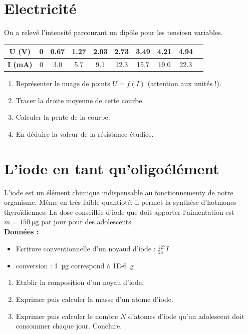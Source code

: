 \documentclass[a4paper,11pt,fleqn]{article}%
\begin{document}
\section{Electricité}
    On a relevé l'intensité parcourant un dipôle pour les tensiosn variables.\\

\begin{tabular}{|c|c|c|c|c|c|c|c|c|c|}
    \hline
    \textbf{U (V)} & \num{0} & \num{0.67} & \num{1.27} &\num{2.03} &\num{2.73} &\num{3.49} &\num{4.21} &\num{4.94}\\ 
    \hline
    \textbf{I (mA)} & \num{0} & \num{3.0} & \num{5.7} &\num{9.1} &\num{12.3} &\num{15.7} &\num{19.0} &\num{22.3} \\
    \hline
\end{tabular}
\begin{enumerate}[resume]
    \item Représenter le nuage de points $U = f(I)$ (attention aux unités !).
    \item Tracer la droite moyenne de cette courbe.
    \item Calculer la pente de la courbe.
    \item En déduire la valeur de la résistance étudiée.
\end{enumerate}

\section{L'iode en tant qu'oligoélément}
L'iode est un élément chimique indispensable au fonctionnementy de notre organisme. Même en très faible quantioté, il permet la synthèse d'hotmones thyroïdiennes. La dose conseillée d'iode que doit apporter l'aimentation est $m = \SI{150}{\micro\gram}$ par jour pour des adolescents.\\
\textbf{Données :}
\begin{itemize}
    \item Ecriture conventionnelle d'un noyaud d'iode : $^{127}_{53}I$
    \item conversion : \SI{1}{\micro\gram} correspond à \SI{1E-6}{\gram}
\end{itemize}
\begin{enumerate}
    \item Etablir la composition d'un noyau d'iode.
    \item Exprimer puis calculer la masse d'un atome d'iode.
    \item Exprimer puis calculer le nombre $N$ d'atomes d'iode qu'un adolescent doit consommer chaque jour. Conclure.
\end{enumerate}
\end{document}
